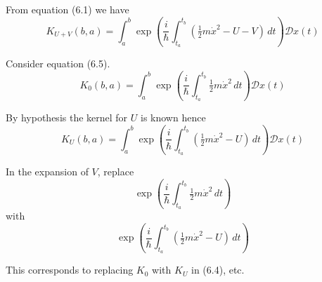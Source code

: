 


From equation (6.1) we have
\begin{equation*}
K_{U+V}(b,a)=\int_a^b
\exp\left(\frac{i}{\hbar}\int_{t_a}^{t_b}\left(\tfrac{1}{2}m\dot x^2-U-V\right)\,dt\right)
\mathcal Dx(t)
\end{equation*}

Consider equation (6.5).
\begin{equation*}
K_0(b,a)=\int_a^b\exp\left(\frac{i}{\hbar}\int_{t_a}^{t_b}\tfrac{1}{2}m\dot x^2\,dt\right)
\mathcal Dx(t)
\tag{6.5}
\end{equation*}

By hypothesis the kernel for $U$ is known hence
\begin{equation*}
K_U(b,a)=\int_a^b
\exp\left(\frac{i}{\hbar}\int_{t_a}^{t_b}\left(\tfrac{1}{2}m\dot x^2-U\right)\,dt\right)
\mathcal Dx(t)
\end{equation*}

In the expansion of $V$, replace
\begin{equation*}
\exp\left(\frac{i}{\hbar}\int_{t_a}^{t_b}\tfrac{1}{2}m\dot x^2\,dt\right)
\end{equation*}
with
\begin{equation*}
\exp\left(\frac{i}{\hbar}\int_{t_a}^{t_b}\left(\tfrac{1}{2}m\dot x^2-U\right)\,dt\right)
\end{equation*}

This corresponds to replacing $K_0$ with $K_U$ in (6.4), etc.


